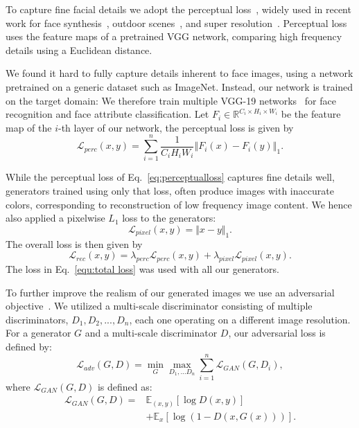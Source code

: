 \label{subsec:Training-Losses}

To capture fine facial details we adopt the perceptual loss~\cite{johnson2016perceptual}, widely used in recent work for
face synthesis~\cite{sanchez2018triple}, outdoor scenes~\cite{wang2018pix2pixHD}, and super resolution~\cite{ledig2017photo}. Perceptual loss uses the feature maps of a pretrained VGG network, comparing high frequency details using a Euclidean distance. 

We found it hard to fully capture details inherent to face images, using a network pretrained on a generic dataset such as ImageNet. Instead, our network is trained on the target
domain: We therefore train multiple VGG-19 networks~\cite{simonyan2014very} for face recognition and face attribute classification. Let $F_{i}\in
\mathbb{R}
^{C_{i}\times H_{i}\times W_{i}}$ be the feature map of the $i$-th layer of
our network, the perceptual loss is given by%
\begin{equation}
\mathcal{L}_{perc}(x,y)=\sum_{i=1}^{n}\frac{1}{C_{i}H_{i}W_{i}}\left\Vert
F_{i}(x)-F_{i}(y)\right\Vert _{1}.\label{eq:perceptualloss}
\end{equation}

While the perceptual loss of Eq.~\eqref{eq:perceptualloss}
captures fine details well, generators trained using only that loss, often produce images with inaccurate colors, corresponding to reconstruction of low frequency image content. We hence also applied a pixelwise $L_{1}$ loss to the generators:%
\begin{equation}
\mathcal{L}_{pixel}(x,y)=\Vert x-y\Vert _{1}.
\end{equation}%
The overall loss is then given by
\begin{equation}
\mathcal{L}_{rec}(x,y)=\lambda _{perc}\mathcal{L}_{perc}(x,y)+\lambda
_{pixel}\mathcal{L}_{pixel}(x,y).  \label{equ:total loss}
\end{equation}
The loss in Eq.~\eqref{equ:total loss} was used with all our generators.%

To further improve the realism of our generated images we use an adversarial objective~\cite{wang2018pix2pixHD}. We utilized a multi-scale discriminator consisting of multiple discriminators, $D_{1},D_{2},...,D_{n}$, each one operating on a different image resolution. For a generator $G$ and a multi-scale discriminator $D$, our adversarial loss is defined by:
\begin{equation}
\mathcal{L}_{adv}(G,D)=\min_{G}\max_{D_{1},\dots D_{n}}\sum_{i=1}^{n}%
\mathcal{L}_{GAN}(G,D_{i}),
\end{equation}%
where $\mathcal{L}_{GAN}(G,D)$ is defined as:
\begin{align}
\mathcal{L}_{GAN}(G,D)=&\mathbb{E}_{(x,y)}[\log D(x,y)]\nonumber\\&+\mathbb{E}_{x}[\log
(1-D(x,G(x)))].
\end{align}

